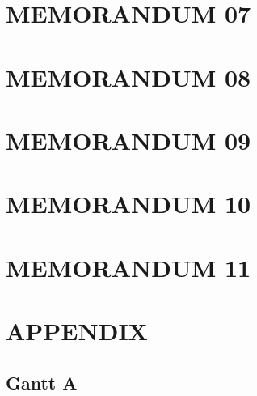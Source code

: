 \documentclass[paper=A4, fontsize=11pt, titlepage]{article}
\numberwithin{equation}{section}
\numberwithin{figure}{section}
\numberwithin{table}{section}
\newcommand*{\sectionpostamble}{}
\newcommand*{\fromto}[1]{\def\sectionpostamble{#1}}
\begin{document}
\section{MEMORANDUM 07}




\clearpage


\fromto{Jun 16 - Jun 20}
\section{MEMORANDUM 08}




\clearpage


\fromto{Jun 23 - Jun 27}
\section{MEMORANDUM 09}




\clearpage


\fromto{Jun 30 - Jul 04}
\section{MEMORANDUM 10}




\clearpage


\fromto{Jul 07 - Aug 01}
\section{MEMORANDUM 11}




\clearpage


\section{APPENDIX}
\subsection{Gantt A}

\end{document}

